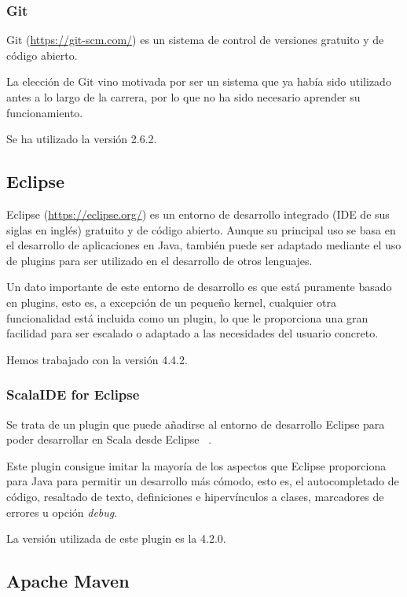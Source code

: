 \subsubsection{Git}

Git (\url{https://git-scm.com/}) es un sistema de control de versiones gratuito y de código abierto.

La elección de Git vino motivada por ser un sistema que ya había sido utilizado antes a lo largo de la carrera, por lo que no ha sido necesario aprender su funcionamiento.

Se ha utilizado la versión 2.6.2.

\subsection{Eclipse}
Eclipse (\url{https://eclipse.org/}) es un entorno de desarrollo integrado (IDE de sus siglas en inglés) gratuito y de código abierto. Aunque su principal uso se basa en el desarrollo de aplicaciones en Java, también puede ser adaptado mediante el uso de plugins para ser utilizado en el desarrollo de otros lenguajes.

Un dato importante de este entorno de desarrollo es que está puramente basado en plugins, esto es, a excepción de un pequeño kernel, cualquier otra funcionalidad está incluida como un plugin, lo que le proporciona una gran facilidad para ser escalado o adaptado a las necesidades del usuario concreto.

Hemos trabajado con la versión 4.4.2.

\subsubsection{ScalaIDE for Eclipse}

Se trata de un plugin que puede añadirse al entorno de desarrollo Eclipse para poder desarrollar en Scala desde Eclipse~\cite{ScalaIDEPage} .

Este plugin consigue imitar la mayoría de los aspectos que Eclipse proporciona para Java para permitir un desarrollo más cómodo, esto es, el autocompletado de código, resaltado de texto, definiciones e hipervínculos a clases, marcadores de errores u opción \textit{debug}.

La versión utilizada de este plugin es la 4.2.0.

\subsection{Apache Maven}

